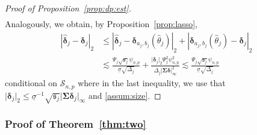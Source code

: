 \documentclass[11pt, a4paper]{article}
\newcommand{\mc}{\mathcal}
\renewcommand{\l}{\left}
\renewcommand{\r}{\right}
\def\wh{\widehat}
\newcommand{\cp}{\theta}
\theoremstyle{definition}
\theoremstyle{definition}
\theoremstyle{definition}
\theoremstyle{definition}
\theoremstyle{definition}
\theoremstyle{remark}
\theoremstyle{definition}
\theoremstyle{definition}
\theoremstyle{definition}
\begin{document}
\begin{proof}[Proof of Proposition~\ref{prop:dp:est}]
\begin{align*}
	\end{align*}
	Analogously, we obtain, by Proposition~\ref{prop:lasso},
	\begin{align*}
	\l\vert \wh{\bm\delta}_j - \bm\delta_j \r\vert_2 &\le 
	\l\vert \wh{\bm\delta}_j - \bm\delta_{a_j, b_j}(\wh\cp_j) \r\vert_2 + \l\vert \bm\delta_{a_j, b_j}(\wh\cp_j) - \bm\delta_j \r\vert_2 \\
	& \lesssim 
	\frac{ \Psi_j \sqrt{\mathfrak{s}_j} \psi_{n, p} }{\underline{\sigma} \sqrt{\Delta_j}}
	+ \frac{ \vert \bm\delta_j \vert_2 \Psi_j^2 \psi^2_{n, p}}{\Delta_j \vert \bm\Sigma \bm\delta \vert_\infty^{2}} 
	\lesssim \frac{ \Psi_j \sqrt{\mathfrak{s}_j} \psi_{n, p}}{\underline{\sigma} \sqrt{\Delta_j}}
	\end{align*}
	conditional on $\mc S_{n, p}$ where in the last inequality, we use that $\vert\bm\delta_j\vert_2 \le \underline{\sigma}^{-1}\sqrt{\mathfrak{s}_j}\vert\bm\Sigma\bm\delta_j\vert_{\infty}$ and \cref{assum:size}.
\end{proof}

\subsubsection{Proof of Theorem~\ref{thm:two}}
\label{sec:pf:thm:two}
\end{document}
